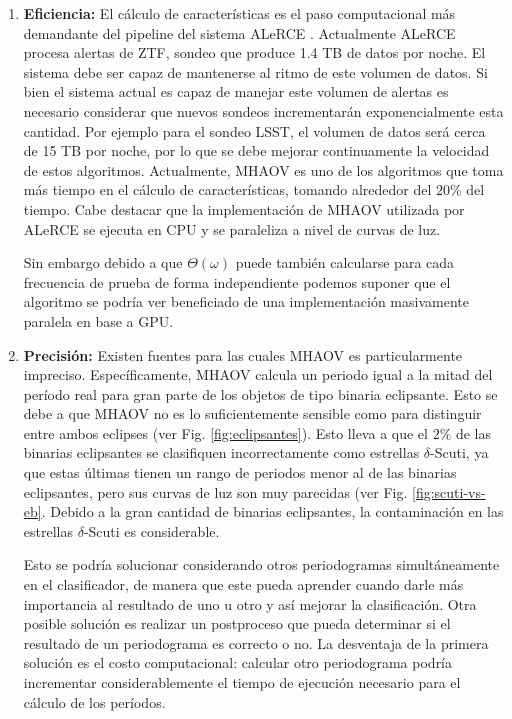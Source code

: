 \begin{enumerate}
    \item {\bf Eficiencia:} El cálculo de características es el paso computacional más demandante del pipeline del sistema ALeRCE \cite{alerce-intro}. Actualmente ALeRCE procesa alertas de ZTF, sondeo que produce 1.4 TB de datos por noche. El sistema debe ser capaz de mantenerse al ritmo de este volumen de datos. Si bien el sistema actual es capaz de manejar este volumen de alertas es necesario considerar que nuevos sondeos incrementarán exponencialmente esta cantidad. Por ejemplo para el sondeo LSST, el volumen de datos será cerca de 15 TB por noche, por lo que se debe mejorar continuamente la velocidad de estos algoritmos. Actualmente, MHAOV es uno de los algoritmos que toma más tiempo en el cálculo de características, tomando alrededor del $20\%$ del tiempo. Cabe destacar que la implementación de MHAOV utilizada por ALeRCE se ejecuta en CPU y se paraleliza a nivel de curvas de luz. 
    
    Sin embargo debido a que $\Theta(\omega)$ puede también calcularse para cada frecuencia de prueba de forma independiente podemos suponer que el algoritmo se podría ver beneficiado de una implementación masivamente paralela en base a GPU.
    


    \item {\bf Precisión:} Existen fuentes para las cuales MHAOV es particularmente impreciso. Específicamente, MHAOV calcula un periodo igual a la mitad del período real para gran parte de los objetos de tipo binaria eclipsante. Esto se debe a que MHAOV no es lo suficientemente sensible como para distinguir entre ambos eclipses (ver Fig. \ref{fig:eclipsantes}). Esto lleva a que el $2\%$ de las binarias eclipsantes se clasifiquen incorrectamente como estrellas $\delta$-Scuti, ya que estas últimas tienen un rango de periodos menor al de las binarias eclipsantes, pero sus curvas de luz son muy parecidas (ver Fig. \ref{fig:scuti-vs-eb}. Debido a la gran cantidad de binarias eclipsantes, la contaminación en las estrellas $\delta$-Scuti es considerable.

    Esto se podría solucionar considerando otros periodogramas simultáneamente en el clasificador, de manera que este pueda aprender cuando darle más importancia al resultado de uno u otro y así mejorar la clasificación. Otra posible solución es realizar un postproceso que pueda determinar si el resultado de un periodograma es correcto o no. La desventaja de la primera  solución es el costo computacional: calcular otro periodograma podría incrementar considerablemente el tiempo de ejecución necesario para el cálculo de los períodos.
\end{enumerate}


